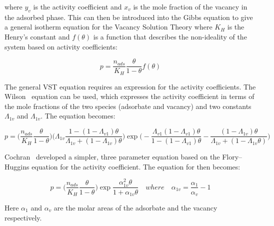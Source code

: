 where \(y_v\) is the activity coefficient and  \(x_v\) is the mole fraction of
the vacancy in the adsorbed phase.
This can then be introduced into the Gibbs equation to give a general isotherm equation
for the Vacancy Solution Theory where \(K_H\) is the Henry’s constant and
\(f(\theta)\) is a function that describes the non-ideality of the system based
on activity coefficients:

\begin{equation}
    p = \frac{n_{ads}}{K_H} \frac{\theta}{1-\theta} f(\theta)
\end{equation}

The general VST equation requires an expression for the activity coefficients.
The Wilson~\cite{suwanayuenGasAdsorptionIsotherm1980} equation can be used, 
which expresses the activity coefficient in terms
of the mole fractions of the two species (adsorbate and vacancy) and two constants
\(\Lambda_{1v}\) and \(\Lambda_{1v}\). The equation becomes:

\begin{equation}\label{eqn:pyg:wvst}
    p = \bigg( \frac{n_{ads}}{K_H} \frac{\theta}{1-\theta} \bigg)
    \bigg( \Lambda_{1v} \frac{1-(1-\Lambda_{v1})\theta}{\Lambda_{1v}+(1-\Lambda_{1v})\theta} \bigg)
    \exp{\bigg( -\frac{\Lambda_{v1}(1-\Lambda_{v1})\theta}{1-(1-\Lambda_{v1})\theta}
    -\frac{(1 - \Lambda_{1v})\theta}{\Lambda_{1v} + (1-\Lambda_{1v}\theta)} \bigg)}
\end{equation}

Cochran~\cite{cochranVacancySolutionTheory1985} 
developed a simpler, three parameter equation based on
the Flory–Huggins equation for the activity coefficient.
The equation for then becomes:

\begin{equation}\label{eqn:pyg:fhvst}
    p = \bigg( \frac{n_{ads}}{K_H} \frac{\theta}{1-\theta} \bigg)
        \exp{\frac{\alpha^2_{1v}\theta}{1+\alpha_{1v}\theta}} 
        \quad where \quad
    \alpha_{1v} = \frac{\alpha_{1}}{\alpha_{v}} - 1
\end{equation}

Here \(\alpha_{1}\) and \(\alpha_{v}\) are the molar areas of the adsorbate
and the vacancy respectively.

